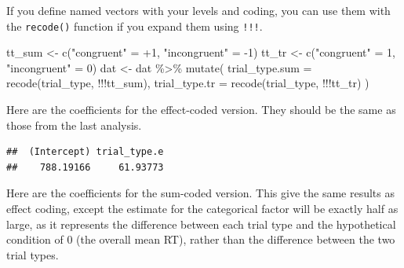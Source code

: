 \documentclass[
  oneside]{book}
\newenvironment{Shaded}{\begin{snugshade}}{\end{snugshade}}
\newcommand{\AttributeTok}[1]{\textcolor[rgb]{0.77,0.63,0.00}{#1}}
\newcommand{\DecValTok}[1]{\textcolor[rgb]{0.00,0.00,0.81}{#1}}
\newcommand{\FunctionTok}[1]{\textcolor[rgb]{0.00,0.00,0.00}{#1}}
\newcommand{\NormalTok}[1]{#1}
\newcommand{\OtherTok}[1]{\textcolor[rgb]{0.56,0.35,0.01}{#1}}
\newcommand{\SpecialCharTok}[1]{\textcolor[rgb]{0.00,0.00,0.00}{#1}}
\newcommand{\StringTok}[1]{\textcolor[rgb]{0.31,0.60,0.02}{#1}}
\begin{document}
If you define named vectors with your levels and coding, you can use them with the \texttt{recode()} function if you expand them using \texttt{!!!}.

\begin{Shaded}
\begin{Highlighting}[]
\NormalTok{tt\_sum }\OtherTok{\textless{}{-}} \FunctionTok{c}\NormalTok{(}\StringTok{"congruent"}   \OtherTok{=} \SpecialCharTok{+}\DecValTok{1}\NormalTok{, }
            \StringTok{"incongruent"} \OtherTok{=} \SpecialCharTok{{-}}\DecValTok{1}\NormalTok{)}
\NormalTok{tt\_tr }\OtherTok{\textless{}{-}} \FunctionTok{c}\NormalTok{(}\StringTok{"congruent"}   \OtherTok{=} \DecValTok{1}\NormalTok{, }
           \StringTok{"incongruent"} \OtherTok{=} \DecValTok{0}\NormalTok{)}
\NormalTok{dat }\OtherTok{\textless{}{-}}\NormalTok{ dat }\SpecialCharTok{\%\textgreater{}\%} \FunctionTok{mutate}\NormalTok{(}
  \AttributeTok{trial\_type.sum =} \FunctionTok{recode}\NormalTok{(trial\_type, }\SpecialCharTok{!!!}\NormalTok{tt\_sum),}
  \AttributeTok{trial\_type.tr =} \FunctionTok{recode}\NormalTok{(trial\_type, }\SpecialCharTok{!!!}\NormalTok{tt\_tr)}
\NormalTok{)}
\end{Highlighting}
\end{Shaded}

Here are the coefficients for the effect-coded version. They should be the same as those from the last analysis.

\begin{Shaded}
\end{Shaded}

\begin{verbatim}
##  (Intercept) trial_type.e 
##    788.19166     61.93773
\end{verbatim}

Here are the coefficients for the sum-coded version. This give the same results as effect coding, except the estimate for the categorical factor will be exactly half as large, as it represents the difference between each trial type and the hypothetical condition of 0 (the overall mean RT), rather than the difference between the two trial types.

\begin{Shaded}
\end{Shaded}
\end{document}

